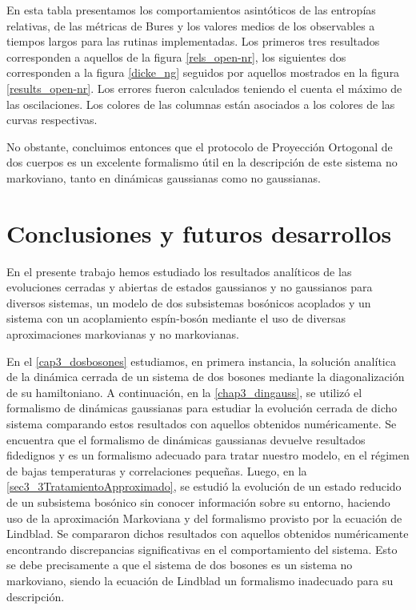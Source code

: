 \documentclass{report} %
\numberwithin{equation}{section}
\begin{document}
\begin{table}
    \begin{tablenotes}
      \small
      \item En esta tabla presentamos los comportamientos asintóticos de las entropías relativas, de las métricas de Bures y los valores medios de los observables a tiempos largos para las rutinas implementadas. Los primeros tres resultados corresponden a aquellos de la figura \ref{rels_open-nr}, los siguientes dos corresponden a la figura \ref{dicke_ng} seguidos por aquellos mostrados en la figura \ref{results_open-nr}. Los errores fueron calculados teniendo el cuenta el máximo de las oscilaciones. Los colores de las columnas están asociados a los colores de las curvas respectivas. 
    \end{tablenotes}
    \label{table4}
\end{table}

No obstante, concluimos entonces que el protocolo de Proyección Ortogonal de dos cuerpos es un excelente formalismo útil en la descripción de este sistema no markoviano, tanto en dinámicas gaussianas como no gaussianas.

\clearpage

\chapter{Conclusiones y futuros desarrollos}
\label{Chapter6}

En el presente trabajo hemos estudiado los resultados analíticos de las evoluciones cerradas y abiertas de estados gaussianos y no gaussianos para diversos sistemas, un modelo de dos subsistemas bosónicos acoplados y un sistema con un acoplamiento espín-bosón mediante el uso de diversas aproximaciones markovianas y no markovianas.

En el  \autoref{cap3_dosbosones} estudiamos, en primera instancia, la solución analítica de la dinámica cerrada de un sistema de dos bosones mediante la diagonalización de su hamiltoniano. A continuación, en la  \autoref{chap3_dingauss}, se utilizó el formalismo de dinámicas gaussianas para estudiar la evolución cerrada de dicho sistema comparando estos resultados con aquellos obtenidos numéricamente. Se encuentra que el formalismo de dinámicas gaussianas devuelve resultados fidedignos y es un formalismo adecuado para tratar nuestro modelo, en el régimen de bajas temperaturas y correlaciones pequeñas. Luego, en la  \autoref{sec3_3TratamientoApproximado}, se estudió la evolución de un estado reducido de un subsistema bosónico sin conocer información sobre su entorno, haciendo uso de la aproximación Markoviana y del formalismo provisto por la ecuación de Lindblad. Se compararon dichos resultados con aquellos obtenidos numéricamente encontrando discrepancias significativas en el comportamiento del sistema. Esto se debe precisamente a que el sistema de dos bosones es un sistema no markoviano, siendo la ecuación de Lindblad un formalismo inadecuado para su descripción. 
\end{document}
